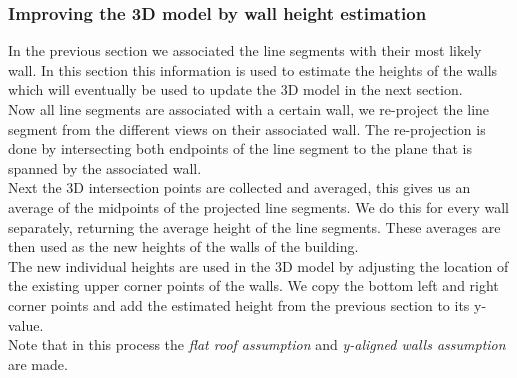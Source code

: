 \documentclass[10pt]{article}
\begin{document}
{	%



	


\subsubsection{Improving the 3D model by wall height estimation}
	In the previous section we associated the line segments with their most
	likely wall. In this section this information is used to estimate the
	heights of the walls which will eventually be used to update the 3D model in the
	next section. \\
	Now all line segments are associated with a certain wall, we re-project the
	line segment from the different views on their associated wall. The
	re-projection is done by intersecting both endpoints of the line segment to
	the plane that is spanned by the associated wall.\\
	Next the 3D intersection points are collected and averaged, this gives us
	an average of the midpoints of the projected line segments. We do this for
	every wall separately, returning the average height of the line segments.
	These averages are then used as the new heights of the walls of the
	building.\\
	The new individual heights are used in the 3D model by adjusting
	the location of the existing upper corner points of the walls. We copy the
	bottom left and right corner points and add the estimated height from the
	previous section to its y-value.\\



	Note that  in this process the \emph{flat roof assumption} and
	\emph{y-aligned walls assumption} are made.






	

}
\end{document}
